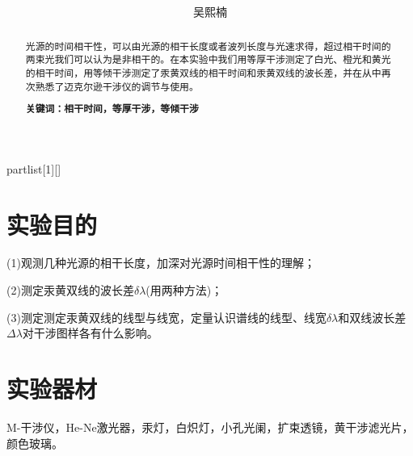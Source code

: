 \documentclass[UTF8]{ctexart}
\author{
	吴熙楠}
\title{
	\heiti{光的时间相干性}
}
\begin{document}
	\maketitle
	\newtheorem{definition}{定义}[subsection]
	\newtheorem{function}{公式}[subsection]
	\newtheorem{summary}{小结}[subsection]
	\newtheorem{deduction}{推论}[subsection]
	\newtheorem{property}{性质}[subsection]
	\newtheorem{theo}{定理}[subsection]
	\newtheorem{step}{步骤}[subsection]
	\newtheorem{remark}{注记}[subsection]
	\newtheorem{proof}{证明}[subsection]
	\newenvironment{Theorem}[1][]{\par\noindent\textbf{定理}(#1)\quad}{\par}
	\newcommand{\rbra}[1]{\left( #1 \right)}
	\newcommand{\sbra}[1]{\left[ #1 \right]}
	\newcommand{\cbra}[1]{\left\{ #1 \right\}}
	\newcommand{\pbra}[1]{\left< #1 \right>}
	\newcommand{\abs}[1]{\left| #1 \right|}
	\newcommand{\fs}[2]{\displaystyle\frac{#1}{#2}}
	
	\newenvironment{myproof}{{\color{blue}证：}}
	
	\newenvironment{partlist}[1][]
	{\begin{enumerate}[itemsep=0pt, label=(\arabic*), wide, labelindent=\parindent, listparindent=\parindent, #1]}
		{\end{enumerate}}
	
	\renewcommand{\contentsname}{目录} %
	\tableofcontents
	\newpage
	\renewcommand{\abstractname}{\large 摘要\\}
	\begin{abstract}
		光源的时间相干性，可以由光源的相干长度或者波列长度与光速求得，超过相干时间的两束光我们可以认为是非相干的。在本实验中我们用等厚干涉测定了白光、橙光和黄光的相干时间，用等倾干涉测定了汞黄双线的相干时间和汞黄双线的波长差，并在从中再次熟悉了迈克尔逊干涉仪的调节与使用。
		
		\textbf{关键词：相干时间，等厚干涉，等倾干涉}
	\end{abstract}
	\section{实验目的}
	(1)观测几种光源的相干长度，加深对光源时间相干性的理解；
	\par (2)测定汞黄双线的波长差$\delta \lambda$(用两种方法)；
	\par (3)测定测定汞黄双线的线型与线宽，定量认识谱线的线型、线宽$\delta \lambda$和双线波长差$\Delta\lambda$对干涉图样各有什么影响。
	\section{实验器材}
	M-干涉仪，He-Ne激光器，汞灯，白炽灯，小孔光阑，扩束透镜，黄干涉滤光片，颜色玻璃。
\end{document}
